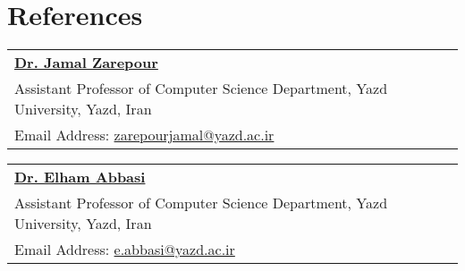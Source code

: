 \documentclass[letter,12pt]{article}
\begin{document}
\section{References}

\begin{tabularx}{\linewidth}{ @{}l X@{} }
\href{https://pws.yazd.ac.ir/jzarepour/}{\textbf{\color{black}Dr. Jamal Zarepour}}\\
\hspace{0.9cm}Assistant Professor of Computer Science Department, Yazd University, Yazd, Iran \\
\hspace{0.9cm}Email Address: \href{mailto:zarepourjamal@yazd.ac.ir}{zarepourjamal@yazd.ac.ir} \\
\end{tabularx}

\begin{tabularx}{\linewidth}{ @{}l X@{} }
\href{https://yazd.ac.ir/people/e.abbasi/}{\textbf{\color{black}Dr. Elham Abbasi}}\\
\hspace{0.9cm}Assistant Professor of Computer Science Department, Yazd University, Yazd, Iran \\
\hspace{0.9cm}Email Address: \href{mailto:e.abbasi@yazd.ac.ir@yazd.ac.ir}{e.abbasi@yazd.ac.ir} \\
\end{tabularx}




\end{document}
